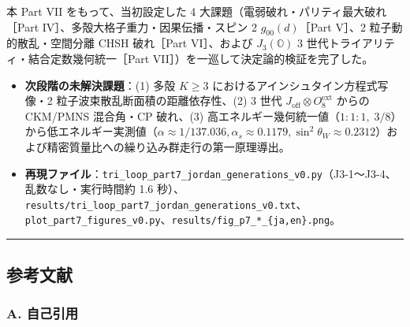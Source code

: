 \documentclass[
  a4paper,
]{ltjsarticle}
\providecommand{\tightlist}{%
  \setlength{\itemsep}{0pt}\setlength{\parskip}{0pt}}
\begin{document}
本 Part VII をもって、当初設定した 4
大課題（電弱破れ・パリティ最大破れ［Part
IV］、多殻大格子重力・因果伝播・スピン 2 \(g_{00}(d)\)［Part V］、2
粒子動的散乱・空間分離 CHSH 破れ［Part VI］、および \(J_3(\mathbb{O})\)
3 世代トライアリティ・結合定数幾何統一［Part
VII］）を一巡して決定論的検証を完了した。

\begin{itemize}
\tightlist
\item
  \textbf{次段階の未解決課題}：(1) 多殻 \(K \ge 3\)
  におけるアインシュタイン方程式写像・2
  粒子波束散乱断面積の距離依存性、(2) 3 世代
  \(J_{\mathrm{off}} \otimes O_8^{\mathrm{ext}}\) からの CKM/PMNS
  混合角・CP 破れ、(3)
  高エネルギー幾何統一値（\(1:1:1,\; 3/8\)）から低エネルギー実測値（\(\alpha \approx 1/137.036, \alpha_s \approx 0.1179, \sin^2\theta_W \approx 0.2312\)）および精密質量比への繰り込み群走行の第一原理導出。
\item
  \textbf{再現ファイル}：\texttt{tri\_loop\_part7\_jordan\_generations\_v0.py}（J3-1〜J3-4、乱数なし・実行時間約
  1.6
  秒）、\texttt{results/tri\_loop\_part7\_jordan\_generations\_v0.txt}、\texttt{plot\_part7\_figures\_v0.py}、\texttt{results/fig\_p7\_*\_\{ja,en\}.png}。
\end{itemize}

\begin{center}\rule{0.5\linewidth}{0.5pt}\end{center}

\subsection{参考文献}\label{ux53c2ux8003ux6587ux732e}

\subsubsection{A. 自己引用}\label{a.-ux81eaux5df1ux5f15ux7528}
\end{document}
